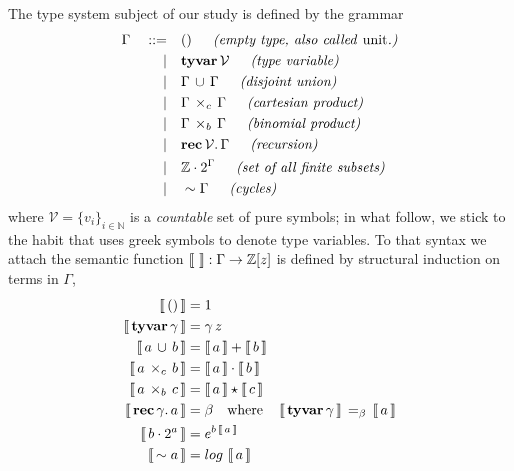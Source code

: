 The type system subject of our study is defined by the grammar
\begin{displaymath}
\begin{split}
\Gamma\quad::=\quad&()\indent\textit{(empty type, also called \emph{unit}.)} \\
             |\quad&\textbf{tyvar}\,\mathcal{V}\indent\textit{(type variable)} \\
             |\quad&\Gamma\,\cup\,\Gamma\indent\textit{(disjoint union)} \\
             |\quad&\Gamma\,\times_{c}\,\Gamma\indent\textit{(cartesian product)} \\
             |\quad&\Gamma\,\times_{b}\,\Gamma\indent\textit{(binomial product)} \\
             |\quad&\textbf{rec}\,\mathcal{V}.\,\Gamma\indent\textit{(recursion)} \\
             |\quad&\mathbb{Z}\cdot2^{\Gamma}\indent\textit{(set of all finite subsets)} \\
             |\quad&\sim\Gamma\indent\textit{(cycles)} \\
\end{split}
\end{displaymath}
where $\mathcal{V}=  \lbrace v_{i} \rbrace_{i\in\mathbb{N}}$ is a
\textit{countable} set of pure symbols; in what follow, we stick to the habit
that uses greek symbols to denote type variables. To that syntax we attach the
semantic function $\left\llbracket\,\,\right\rrbracket: \Gamma \rightarrow \mathbb{Z}[z]$ is defined by
structural induction on terms in $\Gamma$,
\begin{displaymath}
\begin{split}
    \left\llbracket\,()\,\right\rrbracket &= 1 \\
    \left\llbracket\,\textbf{tyvar}\,\gamma\,\right\rrbracket &= \gamma\,z \\
    \left\llbracket\,a\,\cup\,b\,\right\rrbracket &= \left\llbracket\,a\,\right\rrbracket + \left\llbracket\,b\,\right\rrbracket \\
    \left\llbracket\,a\,\times_{c}\,b\,\right\rrbracket &= \left\llbracket\,a\,\right\rrbracket\cdot\left\llbracket\,b\,\right\rrbracket \\
    \left\llbracket\,a\,\times_{b}\,c\,\right\rrbracket &= \left\llbracket\,a\,\right\rrbracket\star\left\llbracket\,c\,\right\rrbracket \\
    \left\llbracket\,\textbf{rec}\,\gamma.\,a\,\right\rrbracket &= \beta  \quad\text{where}\quad
        \left\llbracket\,\textbf{tyvar}\,\gamma\,\right\rrbracket\,=_{\beta}\,\left\llbracket\,a\,\right\rrbracket\\
    \left\llbracket\,b\cdot2^{a}\,\right\rrbracket &= e^{b\,\left\llbracket\,a\,\right\rrbracket}\\
    \left\llbracket\,\sim a\,\right\rrbracket &= log\,\left\llbracket\,a\,\right\rrbracket\\
\end{split}
\end{displaymath}
